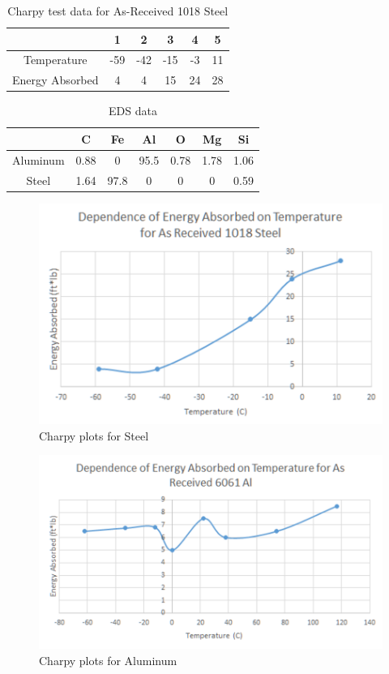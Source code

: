 \documentclass{article}
\begin{document}
\begin{table}[h]
\centering
\caption{Charpy test data for As-Received 1018 Steel}
\begin{tabular}{||c | c | c | c | c | c||}
	\hline
	\ 							& 1 & 2 & 3 & 4 & 5\\
	\hline \hline
	Temperature		& -59 & -42 & -15 & -3 & 11\\
	Energy Absorbed	& 4 & 4 & 15 & 24 & 28\\
	\hline
\end{tabular}
\end{table}

\begin{table}[h]
\centering
\caption{EDS data}
\begin{tabular}{||c | c | c | c | c | c | c||}
	\hline
	\ 				&	C	& Fe & Al & O & Mg & Si\\
	\hline \hline
	Aluminum		& 0.88 & 0 & 95.5 & 0.78 & 1.78 & 1.06\\
	Steel			& 1.64 & 97.8 & 0 & 0 & 0 & 0.59\\
	\hline
\end{tabular}
\end{table}

\begin{figure}[h]
	\centering
	\includegraphics[scale=0.7]{2cf1.png}
	\caption{Charpy plots for Steel}
\end{figure}

\begin{figure}[h]
	\centering
	\includegraphics[scale=0.7]{2cf2.png}
	\caption{Charpy plots for Aluminum}
\end{figure}
\end{document}
